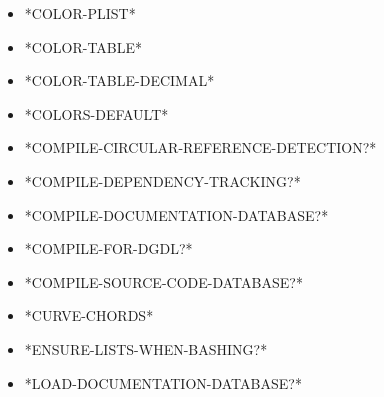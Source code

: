 \documentclass [11pt]{book}
\begin{document}
\begin{itemize}

\item {}*COLOR-PLIST*





\item {}*COLOR-TABLE*





\item {}*COLOR-TABLE-DECIMAL*





\item {}*COLORS-DEFAULT*





\item {}*COMPILE-CIRCULAR-REFERENCE-DETECTION?*





\item {}*COMPILE-DEPENDENCY-TRACKING?*





\item {}*COMPILE-DOCUMENTATION-DATABASE?*





\item {}*COMPILE-FOR-DGDL?*





\item {}*COMPILE-SOURCE-CODE-DATABASE?*





\item {}*CURVE-CHORDS*





\item {}*ENSURE-LISTS-WHEN-BASHING?*





\item {}*LOAD-DOCUMENTATION-DATABASE?*






\end{itemize}
\end{document}
